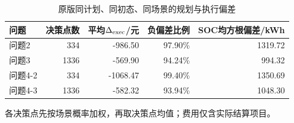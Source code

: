 \begin{table}[htbp]\centering\small
\caption{原版同计划、同初态、同场景的规划与执行偏差}
\label{tab:v2_execution_gap}
\begin{tabularx}{\linewidth}{LRRRR}\toprule
问题 & 决策点数 & 平均$\Delta_{\rm exec}$/元 & 负偏差比例 & SOC均方根偏差/kWh\\\midrule
问题2 & 334 & -986.50 & 97.90\% & 1319.72\\
问题3 & 1336 & -569.90 & 94.24\% & 994.32\\
问题4-2 & 334 & -1068.47 & 99.40\% & 1350.69\\
问题4-3 & 1336 & -582.32 & 93.94\% & 1048.30\\
\bottomrule\end{tabularx}
\par\smallskip\parbox{\linewidth}{\footnotesize 各决策点先按场景概率加权，再取决策点均值；费用仅含实际结算项目。}
\end{table}
